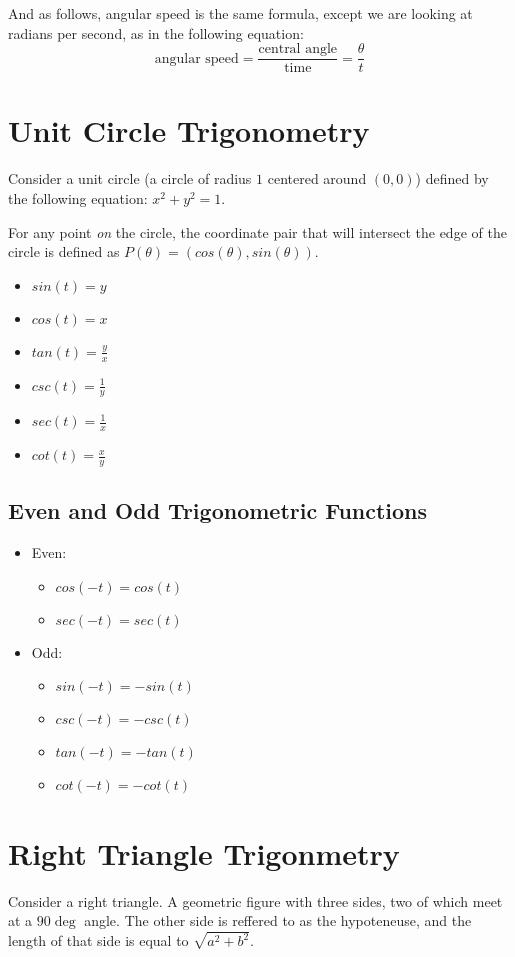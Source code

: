 And as follows, angular speed is the same formula, except we are looking at
radians per second, as in the following equation:
\begin{equation}
  \text{angular speed}=\frac{\text{central angle}}{\text{time}}=\frac{\theta}{t}
\end{equation}

\section{Unit Circle Trigonometry}
Consider a unit circle (a circle of radius $1$ centered around $(0,0)$) defined
by the following equation: $x^2+y^2=1$.

For any point \textit{on} the circle, the coordinate pair that will intersect
the edge of the circle is defined as $P(\theta)=(cos(\theta),sin(\theta))$.

\begin{itemize}
  \item{$sin(t)=y$}
  \item{$cos(t)=x$}
  \item{$tan(t)=\frac{y}{x}$}
  \item{$csc(t)=\frac{1}{y}$}
  \item{$sec(t)=\frac{1}{x}$}
  \item{$cot(t)=\frac{x}{y}$}
\end{itemize}

\subsection{Even and Odd Trigonometric Functions}
\begin{itemize}
  \item{Even:}
    \begin{itemize}
      \item{$cos(-t)=cos(t)$}
      \item{$sec(-t)=sec(t)$}
    \end{itemize}
  \item{Odd:}
    \begin{itemize}
      \item{$sin(-t)=-sin(t)$}
      \item{$csc(-t)=-csc(t)$}
      \item{$tan(-t)=-tan(t)$}
      \item{$cot(-t)=-cot(t)$}
    \end{itemize}
\end{itemize}

\section{Right Triangle Trigonmetry}
Consider a right triangle.  A geometric figure with three sides, two of which
meet at a $90\deg$ angle.  The other side is reffered to as the hypoteneuse, and
the length of that side is equal to $\sqrt{a^2+b^2}$.

